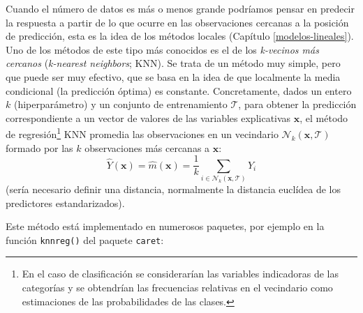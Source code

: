\documentclass[
  spanish,
]{book}
\theoremstyle{break}
\theoremstyle{definition}
\theoremstyle{definition}
\theoremstyle{definition}
\theoremstyle{remark}
\begin{document}
Cuando el número de datos es más o menos grande podríamos pensar en predecir la respuesta a partir de lo que ocurre en las observaciones cercanas a la posición de predicción, esta es la idea de los métodos locales (Capítulo \ref{modelos-lineales}).
Uno de los métodos de este tipo más conocidos es el de los \emph{k-vecinos más cercanos} (\emph{k-nearest neighbors}; KNN).
Se trata de un método muy simple, pero que puede ser muy efectivo, que se basa en la idea de que localmente la media condicional (la predicción óptima) es constante.
Concretamente, dados un entero \(k\) (hiperparámetro) y un conjunto de entrenamiento \(\mathcal{T}\), para obtener la predicción correspondiente a un vector de valores de las variables explicativas \(\mathbf{x}\), el método de regresión\footnote{En el caso de clasificación se considerarían las variables indicadoras de las categorías y se obtendrían las frecuencias relativas en el vecindario como estimaciones de las probabilidades de las clases.} KNN promedia las observaciones en un vecindario \(\mathcal{N}_k(\mathbf{x}, \mathcal{T})\) formado por las \(k\) observaciones más cercanas a \(\mathbf{x}\):
\[\hat{Y}(\mathbf{x}) = \hat{m}(\mathbf{x}) = \frac{1}{k} \sum_{i \in \mathcal{N}_k(\mathbf{x}, \mathcal{T})} Y_i\]
(sería necesario definir una distancia, normalmente la distancia euclídea de los predictores estandarizados).

Este método está implementado en numerosos paquetes, por ejemplo en la función \texttt{knnreg()} del paquete \texttt{caret}:
\end{document}
